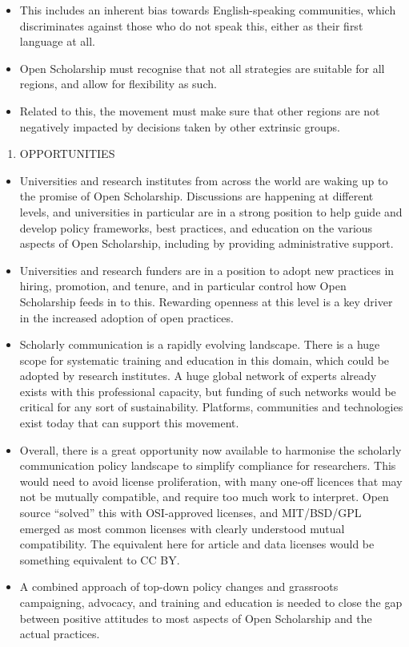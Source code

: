 \documentclass[]{article}
\providecommand{\tightlist}{%
  \setlength{\itemsep}{0pt}\setlength{\parskip}{0pt}}
\begin{document}
\begin{itemize}
  \begin{itemize}
  \item
    This includes an inherent bias towards English-speaking communities,
    which discriminates against those who do not speak this, either as
    their first language at all.
  \item
    Open Scholarship must recognise that not all strategies are suitable
    for all regions, and allow for flexibility as such.
  \item
    Related to this, the movement must make sure that other regions are
    not negatively impacted by decisions taken by other extrinsic
    groups.
  \end{itemize}
\end{itemize}

\begin{enumerate}
\def\labelenumi{\arabic{enumi}.}
\setcounter{enumi}{7}
\tightlist
\item
  OPPORTUNITIES
\end{enumerate}

\begin{itemize}
\item
  Universities and research institutes from across the world are waking
  up to the promise of Open Scholarship. Discussions are happening at
  different levels, and universities in particular are in a strong
  position to help guide and develop policy frameworks, best practices,
  and education on the various aspects of Open Scholarship, including by
  providing administrative support.
\item
  Universities and research funders are in a position to adopt new
  practices in hiring, promotion, and tenure, and in particular control
  how Open Scholarship feeds in to this. Rewarding openness at this
  level is a key driver in the increased adoption of open practices.
\item
  Scholarly communication is a rapidly evolving landscape. There is a
  huge scope for systematic training and education in this domain, which
  could be adopted by research institutes. A huge global network of
  experts already exists with this professional capacity, but funding of
  such networks would be critical for any sort of sustainability.
  Platforms, communities and technologies exist today that can support
  this movement.
\item
  Overall, there is a great opportunity now available to harmonise the
  scholarly communication policy landscape to simplify compliance for
  researchers. This would need to avoid license proliferation, with many
  one-off licences that may not be mutually compatible, and require too
  much work to interpret. Open source ``solved'' this with OSI-approved
  licenses, and MIT/BSD/GPL emerged as most common licenses with clearly
  understood mutual compatibility. The equivalent here for article and
  data licenses would be something equivalent to CC BY.
\item
  A combined approach of top-down policy changes and grassroots
  campaigning, advocacy, and training and education is needed to close
  the gap between positive attitudes to most aspects of Open Scholarship
  and the actual practices.
\end{itemize}
\end{document}
